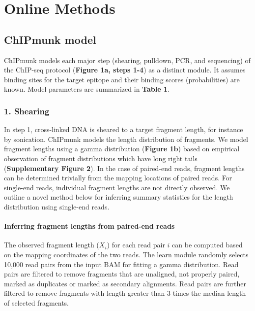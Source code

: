 \documentclass[12pt]{article}
\begin{document}
\section*{Online Methods}

\subsection*{ChIPmunk model}

ChIPmunk models each major step (shearing, pulldown, PCR, and sequencing) of the ChIP-seq protocol (\textbf{Figure 1a, steps 1-4}) as a distinct module. It assumes binding sites for the target epitope and their binding scores (probabilities) are known. Model parameters are summarized in \textbf{Table 1}.

\subsubsection*{1. Shearing}

In step 1, cross-linked DNA is sheared to a target fragment length, for instance by sonication.
ChIPmunk models the length distribution of fragments.
We model fragment lengths using a gamma distribution (\textbf{Figure 1b}) based on empirical observation of fragment distributions which have long right tails (\textbf{Supplementary Figure 2}).
In the case of paired-end reads, fragment lengths can be determined trivially from the mapping locations of paired reads.
For single-end reads, individual fragment lengths are not directly observed.
We outline a novel method below for inferring summary statistics for the length distribution using single-end reads.

\paragraph{Inferring fragment lengths from paired-end reads}
The observed fragment length ($X_i$) for each read pair $i$ can be computed based on the mapping coordinates of the two reads.
The learn module randomly selects 10,000 read pairs from the input BAM for fitting a gamma distribution.
Read pairs are filtered to remove fragments that are unaligned, not properly paired, marked as duplicates or marked as secondary alignments.
Read pairs are further filtered to remove fragments with length greater than 3 times the median length of selected fragments.
\end{document}
